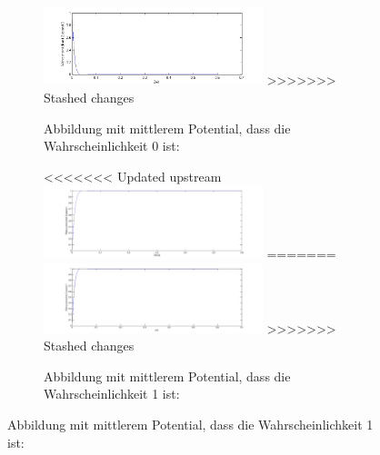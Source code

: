 \begin{refsection}
\begin{figure}
\begin{figure}
\centering
\includegraphics[width=0.7\textwidth]{flash/graphics/StandardZ0.png}
>>>>>>> Stashed changes
\caption{Abbildung mit mittlerem Potential, dass die Wahrscheinlichkeit 0 ist:
\label{skript:StandardZ0}}
\end{figure}
\begin{figure}
\centering
<<<<<<< Updated upstream
\includegraphics[width=0.7\textwidth]{flash/graphics/StandardZ1.pdf}
=======
\includegraphics[width=0.7\textwidth]{flash/graphics/StandardZ1.png}
>>>>>>> Stashed changes
\caption{Abbildung mit mittlerem Potential, dass die Wahrscheinlichkeit 1 ist:
\label{skript:StandardZ1}}
\end{figure}


\end{figure}
\end{refsection}
